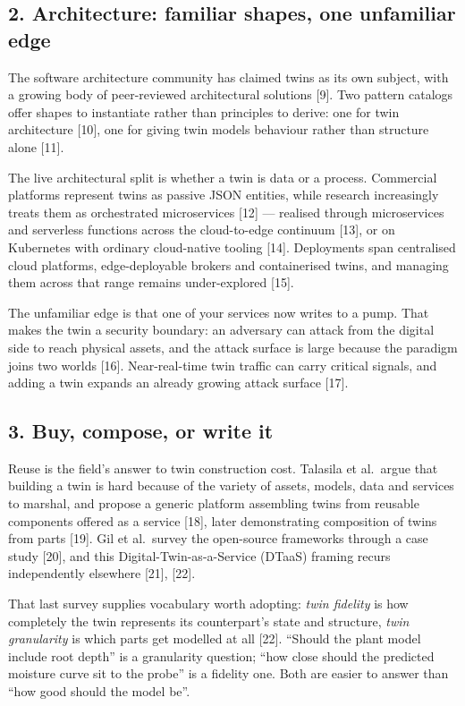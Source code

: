 \documentclass[
  12pt,
  a4paper,
]{article}
\begin{document}
\subsection{2. Architecture: familiar shapes, one unfamiliar
edge}\label{architecture-familiar-shapes-one-unfamiliar-edge}

The software architecture community has claimed twins as its own
subject, with a growing body of peer-reviewed architectural solutions
{[}9{]}. Two pattern catalogs offer shapes to instantiate rather than
principles to derive: one for twin architecture {[}10{]}, one for giving
twin models behaviour rather than structure alone {[}11{]}.

The live architectural split is whether a twin is data or a process.
Commercial platforms represent twins as passive JSON entities, while
research increasingly treats them as orchestrated microservices {[}12{]}
--- realised through microservices and serverless functions across the
cloud-to-edge continuum {[}13{]}, or on Kubernetes with ordinary
cloud-native tooling {[}14{]}. Deployments span centralised cloud
platforms, edge-deployable brokers and containerised twins, and managing
them across that range remains under-explored {[}15{]}.

The unfamiliar edge is that one of your services now writes to a pump.
That makes the twin a security boundary: an adversary can attack from
the digital side to reach physical assets, and the attack surface is
large because the paradigm joins two worlds {[}16{]}. Near-real-time
twin traffic can carry critical signals, and adding a twin expands an
already growing attack surface {[}17{]}.

\subsection{3. Buy, compose, or write it}\label{buy-compose-or-write-it}

Reuse is the field's answer to twin construction cost. Talasila et
al.~argue that building a twin is hard because of the variety of assets,
models, data and services to marshal, and propose a generic platform
assembling twins from reusable components offered as a service {[}18{]},
later demonstrating composition of twins from parts {[}19{]}. Gil et
al.~survey the open-source frameworks through a case study {[}20{]}, and
this Digital-Twin-as-a-Service (DTaaS) framing recurs independently
elsewhere {[}21{]}, {[}22{]}.

That last survey supplies vocabulary worth adopting: \emph{twin
fidelity} is how completely the twin represents its counterpart's state
and structure, \emph{twin granularity} is which parts get modelled at
all {[}22{]}. ``Should the plant model include root depth'' is a
granularity question; ``how close should the predicted moisture curve
sit to the probe'' is a fidelity one. Both are easier to answer than
``how good should the model be''.
\end{document}
